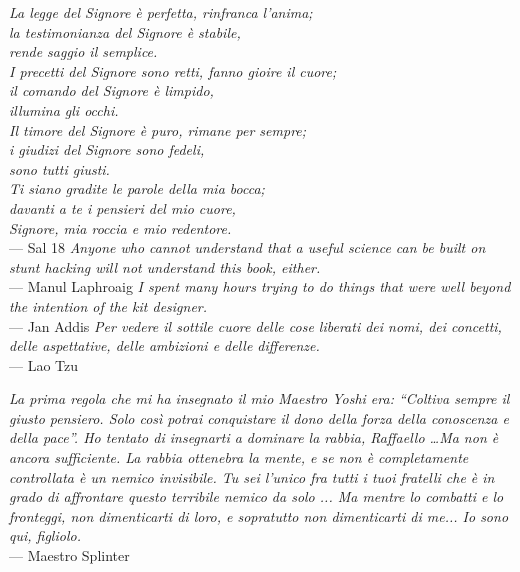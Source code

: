 
\newpage\thispagestyle{empty}
\noindent\textit{La legge del Signore \`e perfetta, rinfranca l’anima; \\
\indent la testimonianza del Signore \`e stabile, \\
\indent rende saggio il semplice. \\
\noindent I precetti del Signore sono retti, fanno gioire il cuore; \\
\indent il comando del Signore \`e limpido, \\
\indent illumina gli occhi. \\
\noindent Il timore del Signore \`e puro, rimane per sempre; \\
\indent i giudizi del Signore sono fedeli, \\
\indent sono tutti giusti. \\
\noindent Ti siano gradite le parole della mia bocca; \\
\indent davanti a te i pensieri del mio cuore, \\
\indent Signore, mia roccia e mio redentore.} \\ \medskip --- Sal 18
\vfill
\noindent\textit{Anyone who cannot understand that a useful science can be
built on stunt hacking will not understand this book, either.}\\ \medskip --- Manul Laphroaig
\vfill
\noindent\textit{I spent many hours trying to do things that were well beyond
the intention of the kit designer.}\\ \medskip --- Jan Addis
\vfill
\noindent\textit{Per vedere il sottile cuore delle cose liberati dei nomi,
dei concetti, delle aspettative, delle ambizioni e delle differenze. }\\
\medskip --- Lao Tzu
\iffalse
\vfill
\noindent\textit{Remember, you are expressing the technique, not doing the technique.}\\
\medskip --- Bruce Lee
\fi
\vfill
\textit{%
La prima regola che mi ha insegnato il mio Maestro Yoshi era:
``Coltiva sempre il giusto pensiero. Solo cos\`i potrai conquistare
il dono della forza della conoscenza e della pace''. Ho tentato di
insegnarti a dominare la rabbia, Raffaello \ldots Ma non \`e ancora
sufficiente.  La rabbia ottenebra la mente, e se non \`e
completamente controllata \`e un nemico invisibile. Tu sei l'unico
fra tutti i tuoi fratelli che \`e in grado di affrontare questo
terribile nemico da solo ... Ma mentre lo combatti e lo fronteggi,
non dimenticarti di loro, e sopratutto non dimenticarti di me...  Io
sono qui, figliolo.  }\\ \medskip --- Maestro Splinter
